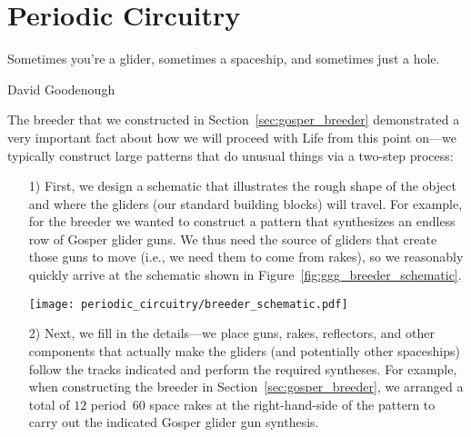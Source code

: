 
\renewcommand{\chapterfolder}{periodic_circuitry/}
\chapter{Periodic Circuitry}\label{chp:periodic_circuitry}


\vspace*{-0.5in}
\epigraph{Sometimes you're a glider, sometimes a spaceship, and sometimes just a hole.}{David Goodenough}
\vspace*{0.1in}


\noindent The breeder that we constructed in Section~\ref{sec:gosper_breeder} demonstrated a very important fact about how we will proceed with Life from this point on---we typically construct large patterns that do unusual things via a two-step process:\smallskip

\begin{enumerate}
	\item[1)] First, we design a schematic that illustrates the rough shape of the object and where the gliders (our standard building blocks) will travel. For example, for the breeder we wanted to construct a pattern that synthesizes an endless row of Gosper glider guns. We thus need the source of gliders that create those guns to move (i.e., we need them to come from rakes), so we reasonably quickly arrive at the schematic shown in Figure~\ref{fig:ggg_breeder_schematic}.\bigskip
	
	\noindent\begin{minipage}{\linewidth}
		\centering
		\texttt{[image: periodic\_circuitry/breeder\_schematic.pdf]}
		\label{fig:ggg_breeder_schematic}\bigskip
	\end{minipage}
	
	\item[2)] Next, we fill in the details---we place guns, rakes, reflectors, and other components that actually make the gliders (and potentially other spaceships) follow the tracks indicated and perform the required syntheses. For example, when constructing the breeder in Section~\ref{sec:gosper_breeder}, we arranged a total of $12$ period~$60$ space rakes at the right-hand-side of the pattern to carry out the indicated Gosper glider gun synthesis.\smallskip
\end{enumerate}

